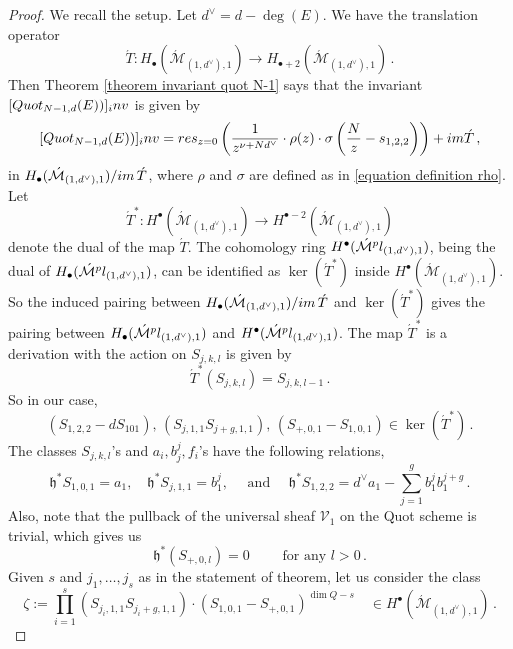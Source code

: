 \documentclass[10pt,a4paper]{amsart}
\newcommand{\Mdash}{\acute{\mathcal{M}}}
\newcommand{\V}{\mathcal{V}}
\newcommand{\du}{d^\vee}
\newcommand{\im}{\textnormal{im}\,}
\newcommand{\inv}[0]{\textnormal{inv}}
\newcommand{\mf}[1]{\mathfrak{#1}}
\newcommand{\pl}[0]{\textnormal{pl}}
\newcommand{\quot}[0]{\textnormal{Quot}}
\newcommand{\res}{\textnormal{res}}
\begin{document}
\begin{proof}
We recall the setup.
Let $\du = d -\deg(E)$.
We have the translation operator
$$\acute T : H_{\bullet}(\Mdash_{(1,\du),1}) \to  H_{\bullet+2}(\Mdash_{(1,\du),1})\,.$$
Then Theorem \ref{theorem invariant quot N-1} says that the invariant 
    $[\quot_{N-1,d}(E))]_\inv$ is given by
    \begin{equation}\label{equation quot N-1 invariant}
    [\quot_{N-1,d}(E))]_\inv = 
    \res_{z=0} \left( \frac{1}{z^{\nu+N\du}} \cdot \rho(z) \cdot \sigma\left(\frac{N}{z} -s_{1,2,2}\right)\right) + \textnormal{im} \acute{T}\,,
    \end{equation}
    in $H_\bullet(\Mdash_{(1,\du),1})/\im \acute T$,
    where $\rho$ and $\sigma$ are defined as in \eqref{equation definition rho}.
Let 
$$\acute{T}^* : H^\bullet(\Mdash_{(1,\du),1}) \to H^{\bullet -2}(\Mdash_{(1,\du),1})$$ 
denote the dual of the map $\acute{T}$. 
The cohomology ring $H^\bullet(\Mdash^\pl_{(1,\du),1})$, 
being the dual of $H_\bullet(\Mdash^\pl_{(1,\du),1})$,
can be identified as $\ker (\acute{T}^*)$ inside $H^\bullet(\Mdash_{(1,\du),1})$.
So the induced pairing between $H_\bullet(\Mdash_{(1,\du),1})/\im \acute{T}$ and $\ker (\acute{T}^*)$
gives the pairing between
$H_\bullet(\Mdash^\pl_{(1,\du),1})$ and $H^\bullet(\Mdash^\pl_{(1,\du),1})$.
The map $\acute{T}^*$ is a derivation with the action on $S_{j,k,l}$ is given by
$$\acute{T}^* (S_{j,k,l}) = S_{j,k,l-1} \,.$$
So in our case,  
\begin{equation}\label{elements of kernel Tdual}
(S_{1,2,2} - dS_{101}),\, (S_{j,1,1}S_{j+g,1,1}), \, 
(S_{+,0,1} - S_{1,0,1})
\in \ker(\acute{T}^*)\,.
\end{equation}
The classes $S_{j,k,l}$'s and $a_i, b_j^j, f_i$'s have the following relations,
\begin{equation}\label{relations of tautological classes}
    \mf h^* S_{1,0,1}=a_1, \quad  
    \mf h^* S_{j,1,1}=b_1^j, 
\quad \text{ and }  
\quad \mf h^* S_{1,2,2} = d^\vee a_1 - \sum_{j=1}^g {b_1^jb_1^{j+g}} \,.
\end{equation}
Also, note that the pullback of the universal sheaf $\V_1$ on the Quot scheme is trivial, which gives us 
$$ \mf h^*(S_{+,0,l}) = 0 \qquad \text{ for any } l>0 \,.$$
    Given $s$ and $j_1,\dots,j_s$ as in the statement of theorem,
    let us consider the class
    $$\zeta:= \prod_{i=1}^s \left(S_{j_i,1,1}S_{j_i+g,1,1} \right) \cdot
    (S_{1,0,1}-S_{+,0,1})^{\dim Q-s} \quad \in 
    H^\bullet(\Mdash_{(1,\du),1})\,.$$

\end{proof}
\end{document}
